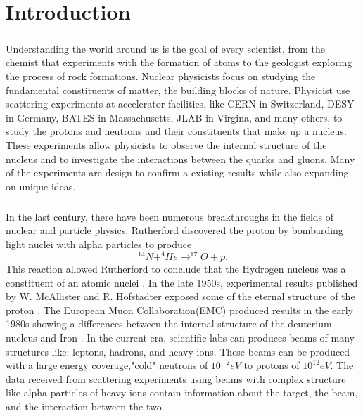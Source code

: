 


\chapter{Introduction}\paragraph{}Understanding the world around us is the goal of every scientist, from the chemist that experiments with the formation of atoms to the geologist exploring the process of rock formations. Nuclear physicists focus on studying the fundamental constituents of matter, the building blocks of nature. Physicist use scattering experiments at accelerator facilities, like CERN in Switzerland, DESY in Germany, BATES in Massachusetts, JLAB in Virgina, and many others, to study the protons and neutrons and their constituents that make up a nucleus. These experiments allow physicists to observe the internal structure of the nucleus and to investigate the interactions between the quarks and gluons. Many of the experiments are design to confirm a existing results while also expanding on unique ideas.
\paragraph{}In the last century, there have been numerous breakthroughs in the fields of nuclear and particle physics. Rutherford discovered the proton by bombarding light nuclei with alpha particles to produce 
	\begin{equation}
	^{14}N + ^4He \rightarrow ^{17}O + p.
	\end{equation}
This reaction allowed Rutherford to conclude that the Hydrogen nucleus was a constituent of an atomic nuclei \cite{PnN}. In the late 1950s, experimental results published by W. McAllister and R. Hofstadter exposed some of the eternal structure of the proton \cite{Flay,Hof}. The European Muon Collaboration(EMC) produced results in the early 1980s showing a differences between the internal structure of the deuterium nucleus and Iron \cite{seeley,CC}. In the current era, scientific labs can produces beams of many structures like; leptons, hadrons, and heavy ions. These beams can be produced with a large energy coverage,"cold" neutrons of $10^{-2}eV$ to protons of $10^{12}eV$. The data received from scattering experiments using beams with complex structure like alpha particles of heavy ions contain information about the target, the beam, and the interaction between the two. 
